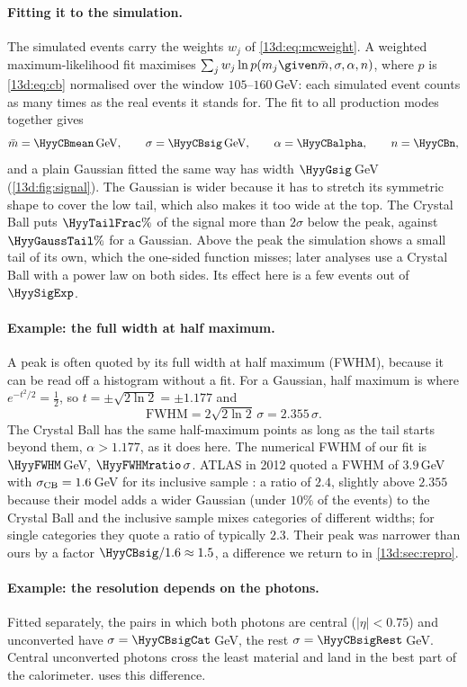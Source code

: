 \paragraph{Fitting it to the simulation.}
The simulated events carry the weights $w_j$ of \eqref{13d:eq:mcweight}. A weighted
maximum-likelihood fit maximises $\sum_jw_j\ln p(m_j\given\bar m,\sigma,\alpha,n)$, where $p$
is \eqref{13d:eq:cb} normalised over the window $105$--$160\,$GeV: each simulated event
counts as many times as the real events it stands for. The fit to all production modes
together gives
\[
  \bar m=\HyyCBmean\,\text{GeV},\qquad \sigma=\HyyCBsig\,\text{GeV},\qquad
  \alpha=\HyyCBalpha,\qquad n=\HyyCBn,
\]
and a plain Gaussian fitted the same way has width $\HyyGsig\,$GeV (\cref{13d:fig:signal}).
The Gaussian is wider because it has to stretch its symmetric shape to cover the low tail,
which also makes it too wide at the top. The Crystal Ball puts $\HyyTailFrac\%$ of the
signal more than $2\sigma$ below the peak, against $\HyyGaussTail\%$ for a Gaussian. Above
the peak the simulation shows a small tail of its own, which the one-sided function misses;
later analyses use a Crystal Ball with a power law on both sides. Its effect here is a
few events out of $\HyySigExp$.

\paragraph{Example: the full width at half maximum.}
A peak is often quoted by its full width at half maximum (FWHM), because it can be read off
a histogram without a fit. For a Gaussian, half maximum is where $e^{-t^2/2}=\tfrac12$, so
$t=\pm\sqrt{2\ln2}=\pm1.177$ and
\[
  \text{FWHM}=2\sqrt{2\ln2}\,\sigma=2.355\,\sigma .
\]
The Crystal Ball has the same half-maximum points as long as the tail starts beyond them,
$\alpha>1.177$, as it does here. The numerical FWHM of our fit is $\HyyFWHM\,$GeV,
$\HyyFWHMratio\,\sigma$. ATLAS in 2012 quoted a FWHM of $3.9\,$GeV with $\sigma_{\rm CB}=1.6\,$GeV
for its inclusive sample : a ratio of $2.4$, slightly above
$2.355$ because their model adds a wider Gaussian (under $10\%$ of the events) to the
Crystal Ball and the inclusive sample mixes categories of different widths; for single
categories they quote a ratio of typically $2.3$. Their peak was narrower than
ours by a factor $\HyyCBsig/1.6\approx1.5$, a difference we return to in \cref{13d:sec:repro}.

\paragraph{Example: the resolution depends on the photons.}
Fitted separately, the pairs in which both photons are central ($|\eta|<0.75$) and
unconverted have $\sigma=\HyyCBsigCat\,$GeV, the rest $\sigma=\HyyCBsigRest\,$GeV. Central
unconverted photons cross the least material and land in the best part of the calorimeter.
 uses this difference.

